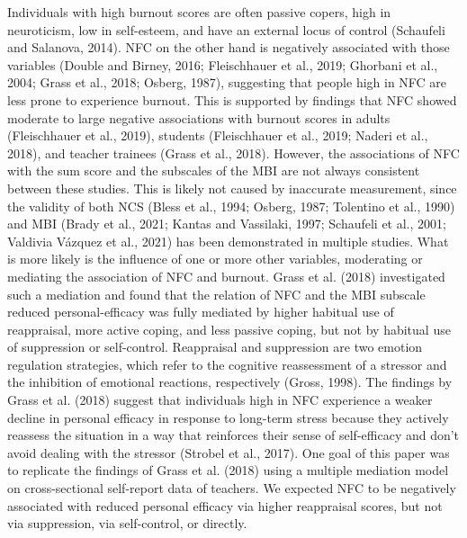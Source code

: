 \documentclass[
  english,
  man,floatsintext]{apa6}
\begin{document}
Individuals with high burnout scores are often passive copers, high in neuroticism, low in self-esteem, and have an external locus of control (Schaufeli and Salanova, 2014).
NFC on the other hand is negatively associated with those variables (Double and Birney, 2016; Fleischhauer et al., 2019; Ghorbani et al., 2004; Grass et al., 2018; Osberg, 1987), suggesting that people high in NFC are less prone to experience burnout.
This is supported by findings that NFC showed moderate to large negative associations with burnout scores in adults (Fleischhauer et al., 2019), students (Fleischhauer et al., 2019; Naderi et al., 2018), and teacher trainees (Grass et al., 2018).
However, the associations of NFC with the sum score and the subscales of the MBI are not always consistent between these studies.
This is likely not caused by inaccurate measurement, since the validity of both NCS (Bless et al., 1994; Osberg, 1987; Tolentino et al., 1990) and MBI (Brady et al., 2021; Kantas and Vassilaki, 1997; Schaufeli et al., 2001; Valdivia Vázquez et al., 2021) has been demonstrated in multiple studies.
What is more likely is the influence of one or more other variables, moderating or mediating the association of NFC and burnout.
Grass et al. (2018) investigated such a mediation and found that the relation of NFC and the MBI subscale reduced personal-efficacy was fully mediated by higher habitual use of reappraisal, more active coping, and less passive coping, but not by habitual use of suppression or self-control.
Reappraisal and suppression are two emotion regulation strategies, which refer to the cognitive reassessment of a stressor and the inhibition of emotional reactions, respectively (Gross, 1998).
The findings by Grass et al. (2018) suggest that individuals high in NFC experience a weaker decline in personal efficacy in response to long-term stress because they actively reassess the situation in a way that reinforces their sense of self-efficacy and don't avoid dealing with the stressor (Strobel et al., 2017).
One goal of this paper was to replicate the findings of Grass et al. (2018) using a multiple mediation model on cross-sectional self-report data of teachers.
We expected NFC to be negatively associated with reduced personal efficacy via higher reappraisal scores, but not via suppression, via self-control, or directly.
\end{document}
